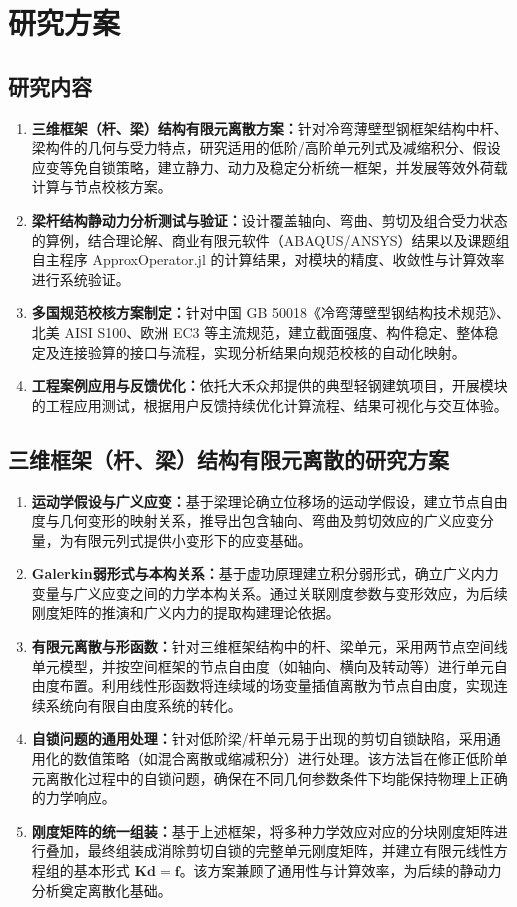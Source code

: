\section{研究方案}

\subsection{研究内容}
\begin{enumerate}[label=\arabic*., leftmargin=2em]
    \item \textbf{三维框架（杆、梁）结构有限元离散方案：}针对冷弯薄壁型钢框架结构中杆、梁构件的几何与受力特点，研究适用的低阶/高阶单元列式及减缩积分、假设应变等免自锁策略，建立静力、动力及稳定分析统一框架，并发展等效外荷载计算与节点校核方案。
    \item \textbf{梁杆结构静动力分析测试与验证：}设计覆盖轴向、弯曲、剪切及组合受力状态的算例，结合理论解、商业有限元软件（ABAQUS/ANSYS）结果以及课题组自主程序 ApproxOperator.jl 的计算结果，对模块的精度、收敛性与计算效率进行系统验证。
    \item \textbf{多国规范校核方案制定：}针对中国 GB 50018《冷弯薄壁型钢结构技术规范》、北美 AISI S100、欧洲 EC3 等主流规范，建立截面强度、构件稳定、整体稳定及连接验算的接口与流程，实现分析结果向规范校核的自动化映射。
    \item \textbf{工程案例应用与反馈优化：}依托大禾众邦提供的典型轻钢建筑项目，开展模块的工程应用测试，根据用户反馈持续优化计算流程、结果可视化与交互体验。
\end{enumerate}

\subsection{三维框架（杆、梁）结构有限元离散的研究方案}
\begin{enumerate}[label=\arabic*., leftmargin=2em]
    \item \textbf{运动学假设与广义应变：}基于梁理论确立位移场的运动学假设，建立节点自由度与几何变形的映射关系，推导出包含轴向、弯曲及剪切效应的广义应变分量，为有限元列式提供小变形下的应变基础。
    \item \textbf{Galerkin弱形式与本构关系：}基于虚功原理建立积分弱形式，确立广义内力变量与广义应变之间的力学本构关系。通过关联刚度参数与变形效应，为后续刚度矩阵的推演和广义内力的提取构建理论依据。
    \item \textbf{有限元离散与形函数：}针对三维框架结构中的杆、梁单元，采用两节点空间线单元模型，并按空间框架的节点自由度（如轴向、横向及转动等）进行单元自由度布置。利用线性形函数将连续域的场变量插值离散为节点自由度，实现连续系统向有限自由度系统的转化。
    \item \textbf{自锁问题的通用处理：}针对低阶梁/杆单元易于出现的剪切自锁缺陷，采用通用化的数值策略（如混合离散或缩减积分）进行处理。该方法旨在修正低阶单元离散化过程中的自锁问题，确保在不同几何参数条件下均能保持物理上正确的力学响应。
    \item \textbf{刚度矩阵的统一组装：}基于上述框架，将多种力学效应对应的分块刚度矩阵进行叠加，最终组装成消除剪切自锁的完整单元刚度矩阵，并建立有限元线性方程组的基本形式 \(\mathbf{K}\mathbf{d} = \mathbf{f}\)。该方案兼顾了通用性与计算效率，为后续的静动力分析奠定离散化基础。
\end{enumerate}

